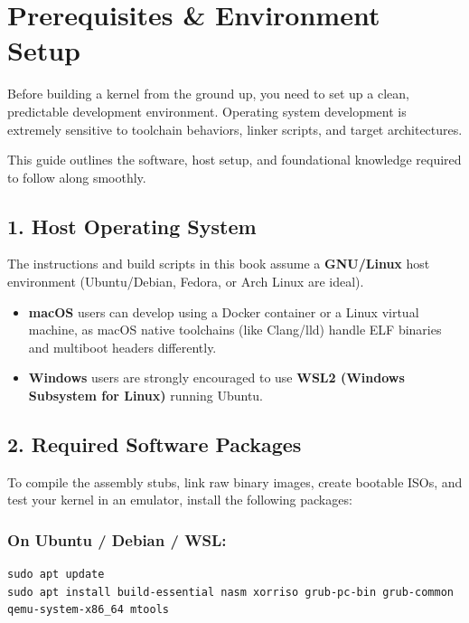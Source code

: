 \chapter{Prerequisites \& Environment Setup}

Before building a kernel from the ground up, you need to set up a clean, predictable development environment. Operating system development is extremely sensitive to toolchain behaviors, linker scripts, and target architectures.

This guide outlines the software, host setup, and foundational knowledge required to follow along smoothly.

\section{1. Host Operating System}

The instructions and build scripts in this book assume a \textbf{GNU/Linux} host environment (Ubuntu/Debian, Fedora, or Arch Linux are ideal).

\begin{itemize}
\tightlist
\item
  \textbf{macOS} users can develop using a Docker container or a Linux virtual machine, as macOS native toolchains (like Clang/lld) handle ELF binaries and multiboot headers differently.
\item
  \textbf{Windows} users are strongly encouraged to use \textbf{WSL2 (Windows Subsystem for Linux)} running Ubuntu.
\end{itemize}

\section{2. Required Software Packages}

To compile the assembly stubs, link raw binary images, create bootable ISOs, and test your kernel in an emulator, install the following packages:

\subsection{On Ubuntu / Debian / WSL:}

\begin{lstlisting}
sudo apt update
sudo apt install build-essential nasm xorriso grub-pc-bin grub-common qemu-system-x86_64 mtools

\end{lstlisting}

